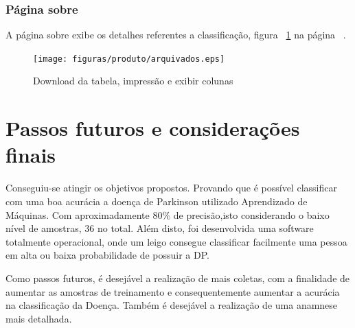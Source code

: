 \subsubsection{Página sobre}
A página sobre exibe os detalhes referentes a classificação, figura ~\ref{farquivados} na página ~\pageref{farquivados}.
\begin{figure}[!htb]
    \centering
    \texttt{[image: figuras/produto/arquivados.eps]}
    \caption{Download da tabela, impressão e exibir colunas}
    \label{farquivados}
\end{figure}

\section{Passos futuros e considerações finais}
   Conseguiu-se atingir os objetivos propostos. Provando que é possível classificar com uma boa acurácia a doença de Parkinson utilizado Aprendizado de Máquinas. Com aproximadamente 80\% de precisão,isto considerando o baixo nível de amostras, 36 no total. Além disto, foi desenvolvida uma software totalmente operacional, onde um leigo consegue classificar facilmente uma pessoa em alta ou baixa probabilidade de possuir a DP.

   Como passos futuros, é desejável a realização de mais coletas, com a finalidade de aumentar as amostras de treinamento e consequentemente aumentar a acurácia na classificação da Doença. Também é desejável a realização de uma anamnese mais detalhada.
